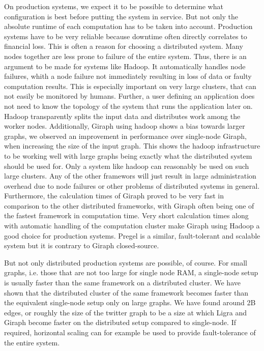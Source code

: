 On production systems, we expect it to be possible to determine what configuration is best before putting the system in service.
But not only the absolute runtime of each computation has to be taken into account. Production systems have to be very reliable because downtime often directly correlates to financial loss.
This is often a reason for choosing a distributed system. Many nodes together are less prone to failure of the entire system.
Thus, there is an argument to be made for systems like Hadoop.
It automatically handles node failures, whith a node failure not immediately resulting in loss of data or faulty computation results.
This is especially important on very large clusters, that can not easily be monitored by humans.
Further, a user defining an application does not need to know the topology of the system that runs the application later on.
Hadoop transparently splits the input data and distributes work among the worker nodes.
Additionally, Giraph using hadoop shows a bias towards larger graphs, we observed an improvement in performance over single-node Giraph, when increasing the size of the input graph.
This shows the hadoop infrastructure to be working well with large graphs being exactly what the distributed system should be used for. 
Only a system like hadoop can reasonably be used on such large clusters.
Any of the other framewors will just result in large administration overhead due to node failures or other problems of distributed systems in general.
Furthermore, the calculation times of Giraph proved to be very fast in comparison to the other distributed frameworks, with Giraph often being one of the fastest framework in computation time.
Very short calculation times along with automatic handling of the computation cluster make Giraph using Hadoop a good choice for production systems.
Pregel is a similar, fault-tolerant and scalable system but it is contrary to Giraph closed-source.

But not only distributed production systems are possible, of course. 
For small graphs, i.e. those that are not too large for single node RAM, a single-node setup is usually faster than the same framework on a distributed cluster. 
We have shown that the distributed cluster of the same framework becomes faster than the equivalent single-node setup only on large graphs.
We have found around 2B edges, or roughly the size of the twitter graph to be a size at which Ligra and Giraph become faster on the distributed setup compared to single-node.
If required, horizontal scaling can for example be used to provide fault-tolerance of the entire system.

